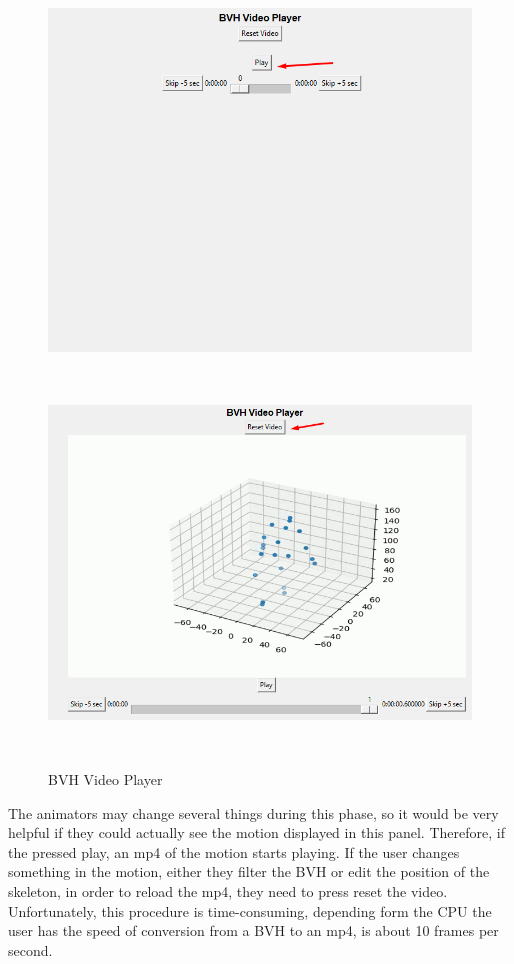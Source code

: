 \begin{figure}[htp]
	\centering
	{\includegraphics[height=10cm,width=0.48\linewidth]{figures/Requirements/Workflow2_2.png}}
	\hspace{1em}%
	{\includegraphics[height=10cm, width=0.48\linewidth]{figures/Requirements/Workflow2_3.png}}
	\captionsetup{labelformat=empty}
	\caption{BVH Video Player}
\end{figure}

The animators may change several things during this phase, so it would be very helpful if they could actually see the motion displayed in this panel. Therefore, if the pressed play, an mp4 of the motion starts playing. If the user changes something in the motion, either they filter the BVH or edit the position of the skeleton, in order to reload the mp4, they need to press reset the video. Unfortunately, this procedure is time-consuming, depending form the CPU the user has the speed of conversion from a BVH to an mp4, is about 10 frames per second.

